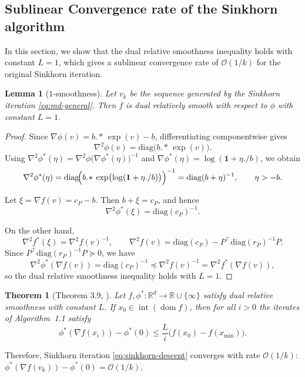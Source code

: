\documentclass{article}
\theoremstyle{plain}
\newtheorem{theorem}{Theorem}
\newtheorem{lemma}{Lemma}
\newtheorem{corollary}{Corollary}
\theoremstyle{remark}
\begin{document}
\subsection{Sublinear Convergence rate of the Sinkhorn algorithm}
In this section, we show that the dual relative smoothness inequality holds with constant $L=1$, which gives a sublinear convergence rate of $\mathcal{O}(1/k)$ for the original Sinkhorn iteration. 
\begin{lemma}[$1$-smoothness]
Let $v_k$ be the sequence generated by the Sinkhorn iteration \eqref{eq:md-general}. Then $f$ is dual relatively smooth with respect to $\phi$ with constant $L=1$.
\end{lemma}
\begin{proof}
Since $\nabla \phi(v)=b.\!*\,\exp(v)-b$, differentiating componentwise gives
$$
\nabla^2 \phi(v)=\mathrm{diag}\bigl(b.\!*\,\exp(v)\bigr).
$$
Using $\nabla^2 \phi^*(\eta)=\nabla^2 \phi\bigl(\nabla \phi^*(\eta)\bigr)^{-1}$ and $\nabla \phi^*(\eta)=\log(\mathbf{1}+\eta./b)$, we obtain
$$
\nabla^2 \phi^*(\eta)
=\mathrm{diag}\!\Bigl(b.\!*\,\exp\bigl(\log(\mathbf{1}+\eta./b)\bigr)\Bigr)^{-1}
=\mathrm{diag}(b+\eta)^{-1},
\qquad \eta>-b.
$$

Let $\xi=\nabla f(v)=c_P-b$. Then $b+\xi=c_P$, and hence
$$
\nabla^2 \phi^*(\xi)=\mathrm{diag}(c_P)^{-1}.
$$

On the other hand,
$$
\nabla^2 f^*(\xi)=\nabla^2 f(v)^{-1},
\qquad
\nabla^2 f(v)=\mathrm{diag}(c_P)-P^\top \mathrm{diag}(r_P)^{-1}P.
$$
Since $P^\top \mathrm{diag}(r_P)^{-1}P\succeq 0$, we have 
$$
\nabla^2 \phi^*(\nabla f(v))=\mathrm{diag}(c_P)^{-1}\preceq \nabla^2 f(v)^{-1}=\nabla^2 f^*(\nabla f(v)),
$$
so the dual relative smoothness inequality holds with $L=1$.
\end{proof}

\begin{theorem}[Theorem 3.9, \cite{maddison2021dual}]
Let $f,\phi^* : \mathbb{R}^d \to \mathbb{R}\cup\{\infty\}$ satisfy dual relative smoothness with constant $L$. If $x_0 \in \operatorname{int}(\operatorname{dom} f)$, then for all $i>0$ the iterates of Algorithm~1.1 satisfy
\begin{equation}
\phi^*(\nabla f(x_i))-\phi^*(0)
\le
\frac{L}{i}\bigl(f(x_0)-f(x_{\min})\bigr).
\end{equation}
\end{theorem}
Therefore, Sinkhorn iteration \eqref{eq:sinkhorn-descent} converges with rate $\mathcal{O}(1/k)$: $\phi^*(\nabla f(v_k))-\phi^*(0)=\mathcal{O}(1/k)$. 
\end{document}
